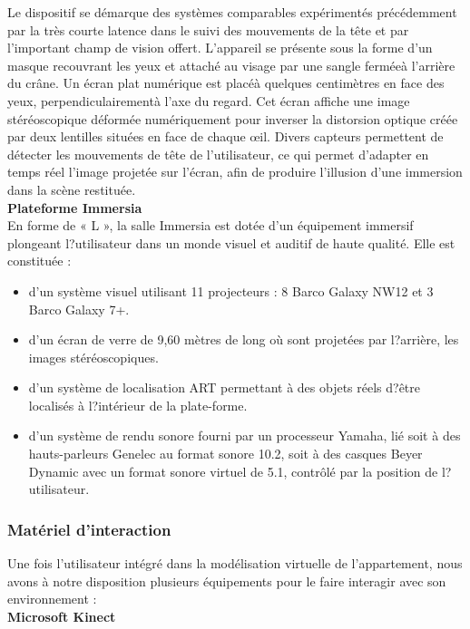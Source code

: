 Le dispositif se démarque des systèmes comparables expérimentés précédemment par la très courte latence dans le suivi des mouvements de la tête et par l'important champ de vision offert. L'appareil se présente sous la forme d'un masque recouvrant les yeux et attaché au visage par une sangle ferméeà l'arrière du crâne. Un écran plat numérique est placéà quelques centimètres en face des yeux, perpendiculairementà l'axe du regard. Cet écran affiche une image stéréoscopique déformée numériquement pour inverser la distorsion optique créée par deux lentilles situées en face de chaque œil. Divers capteurs permettent de détecter les mouvements de tête de l'utilisateur, ce qui permet d'adapter en temps réel l'image projetée sur l'écran, afin de produire l'illusion d'une immersion dans la scène restituée.
\\

\textbf{Plateforme Immersia}
\\

En forme de « L », la salle Immersia est dotée d'un équipement immersif plongeant l?utilisateur dans un monde visuel et auditif de haute qualité. 
Elle est constituée  :
\begin{itemize}
  \item d'un système visuel utilisant 11 projecteurs : 8 Barco Galaxy NW12 et 3 Barco Galaxy 7+.
  \item d'un écran de verre de 9,60 mètres de long où sont projetées par l?arrière, les images stéréoscopiques.
  \item d'un système de localisation ART permettant à des objets réels d?être localisés à l?intérieur de la plate-forme.
  \item d'un système de rendu sonore fourni par un processeur Yamaha, lié soit à des hauts-parleurs Genelec au format sonore 10.2, soit à des casques Beyer Dynamic avec un format sonore virtuel de 5.1, contrôlé par la position de l?utilisateur.
\end{itemize}

\subsubsection{Matériel d'interaction}
Une fois l'utilisateur intégré dans la modélisation virtuelle de l'appartement, nous avons à notre disposition plusieurs équipements pour le faire interagir avec son environnement :
\\

\textbf{Microsoft Kinect}
\\

